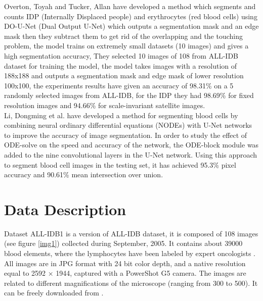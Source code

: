 \documentclass[conference]{IEEEtran}
\begin{document}
Overton, Toyah and Tucker, Allan \cite{10.1007/978-3-030-44584-3_31} have developed a method which segments and counts IDP (Internally Displaced people) and erythrocytes (red blood cells) using DO-U-Net (Dual Output U-Net) which outputs a segmentation mask and an edge mask then they subtract them to get rid of the overlapping and the touching problem, the model trains on extremely small datasets (10 images) and gives a high segmentation accuracy, They selected 10 images of 108 from ALL-IDB dataset for training the model, the model takes images with a resolution of 188x188 and outputs a segmentation mask and edge mask of lower resolution 100x100, the experiments results have given an accuracy of 98.31\% on a 5 randomly selected images from ALL-IDB, for the IDP they had 98.69\% for fixed resolution images and 94.66\% for scale-invariant satellite images.\\

Li, Dongming et al. \cite{li2021robust} have developed a method for segmenting blood cells by combining neural ordinary differential equations (NODEs) with U-Net networks to improve the accuracy of image segmentation. In order to study the effect of ODE-solve on the speed and accuracy of the network, the ODE-block module was added to the nine convolutional layers in the U-Net network. Using this approach to segment blood cell images in the testing set, it has achieved 95.3\% pixel accuracy and 90.61\% mean intersection over union.

\section{Data Description}
Dataset ALL-IDB1 is a version of ALL-IDB dataset, it is composed of 108 images (see figure \ref{img1}) collected during September, 2005. It contains about 39000 blood elements, where the lymphocytes have been labeled by expert oncologists \cite{labati2011all}. All images are in JPG format with 24 bit color depth, and a native resolution equal to 2592 × 1944, captured with a PowerShot G5 camera. The images are related to different magnifications of the microscope (ranging from 300 to 500). It can be freely downloaded from \cite{ALL_IDB_L}.
\end{document}
